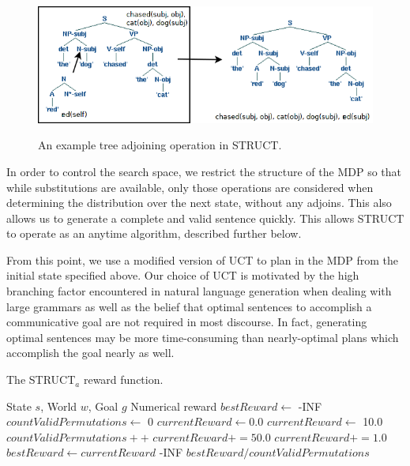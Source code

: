 \begin{figure}[t]
\centering
\includegraphics[width= 0.7 \linewidth]{adjoin-example.png}\label{examples-a}
\caption{An example tree adjoining operation in STRUCT.}
\end{figure}

In order to control the search space, we restrict the structure of the
MDP so that while substitutions are available, only those operations
are considered when determining the distribution over the next state,
without any adjoins.  This also allows us to generate a
complete and valid sentence quickly.  This allows STRUCT to operate as
an anytime algorithm, described further below.

From this point, we use a modified version of UCT
to plan in the MDP from the initial state specified above. 
Our choice of UCT is motivated by the high branching factor encountered in natural language generation when dealing with
large grammars as well as the belief that optimal sentences to accomplish a communicative goal are not required in most
discourse. In fact, generating optimal sentences may be more time-consuming than nearly-optimal plans which accomplish
the goal nearly as well.

\begin{algorithm}
\caption{The STRUCT$_a$ reward function.}\label{struct-a}
\begin{algorithmic}[1]
\REQUIRE State $s$, World $w$, Goal $g$
\ENSURE Numerical reward
\STATE $bestReward \gets$ -INF
\STATE $countValidPermutations \gets$ 0
	\STATE $currentReward \gets 0.0$
		\STATE $currentReward \gets$ 10.0
		\STATE $countValidPermutations++$
	\ENDIF
		\STATE $currentReward += 50.0$
	\ENDIF
			\STATE $currentReward += 1.0$
		\ENDIF
	\ENDFOR
		\STATE $bestReward \gets currentReward$
	\ENDIF
\ENDFOR
{}
	\RETURN -INF
\ENDIF
\RETURN $bestReward / countValidPermutations$
\end{algorithmic}
\end{algorithm}

